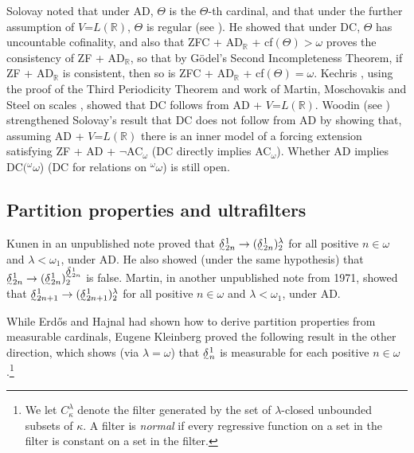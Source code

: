 \documentclass{book}%
\newcommand{\breals}{{^{\omega}}\omega}
\def\undertilde#1{{\baselineskip=0pt\vtop
  {\hbox{$#1$}\hbox{$\scriptscriptstyle\sim$}}}{}}
\newcommand{\utdelta}{\undertilde{\delta}}
\begin{document}
Solovay noted that under AD, $\Theta$ is the
$\Theta$-th cardinal, and that under the further assumption of $V
\mathord{=} L(\mathbb{R})$, $\Theta$ is regular (see
\cite[p.~398]{Kanamori}). He showed 
that under DC, $\Theta$ has uncountable cofinality, and also that
ZFC + AD$_{\mathbb{R}}$ + cf$(\Theta) > \omega$ proves the
consistency of ZF + AD$_{\mathbb{R}}$, so that by G\"{o}del's Second
Incompleteness Theorem, if ZF + AD$_{\mathbb{R}}$ is consistent,
then so is ZFC + AD$_{\mathbb{R}}$ + cf$(\Theta) = \omega$.
Kechris , using the proof
of the Third Periodicity Theorem and work of Martin,
Moschovakis and Steel
on scales \cite{MartinMoschovakisSteel}, showed that DC follows from
AD + $V\mathord{=}L(\mathbb{R})$. Woodin (see
\cite{Kechris:1984}) strengthened Solovay's
result that DC does not follow from AD by showing that, assuming AD
+ $V\mathord{=}L(\mathbb{R})$ there is an inner model of a forcing
extension satisfying  ZF + AD + $\neg$AC$_{\omega}$ (DC
directly implies AC$_{\omega}$). Whether AD implies
DC$(\breals$) (DC for relations on $\breals$) \index{DC$(\breals)$}
is still open.

\subsection{Partition properties and ultrafilters}\label{ppmeas}

Kunen in an unpublished note   proved that
$\undertilde{\delta}^{1}_{2n} \to (\undertilde{\delta}^{1}_{2n})^{\lambda}_{2}$ for all positive $n \in \omega$ and $\lambda < \omega_{1}$,
under AD. He also showed  (under the same hypothesis)  that $\undertilde{\delta}^{1}_{2n} \to (\utdelta^{1}_{2n})^{\utdelta^{1}_{2n}}_{2}$ is false.
Martin, in another
unpublished note from 1971, showed that $\undertilde{\delta}^{1}_{2n+1} \to (\undertilde{\delta}^{1}_{2n+1})^{\lambda}_{2}$ for all positive $n \in \omega$ and $\lambda < \omega_{1}$,
under AD.


While Erd\H{o}s and Hajnal  had
shown how to derive partition properties from measurable cardinals,
Eugene Kleinberg proved the following result in the other direction,
which shows (via $\lambda = \omega$) that $\undertilde{\delta}^{1}_{n}$ is measurable for each
positive $n \in \omega$.\footnote{We let
$C^{\lambda}_{\kappa}$ denote the
filter generated by the set of $\lambda$-closed unbounded
subsets of $\kappa$. A filter is \emph{normal}
if every regressive function on a set in the filter is constant on a
set in the filter.}
\end{document}
